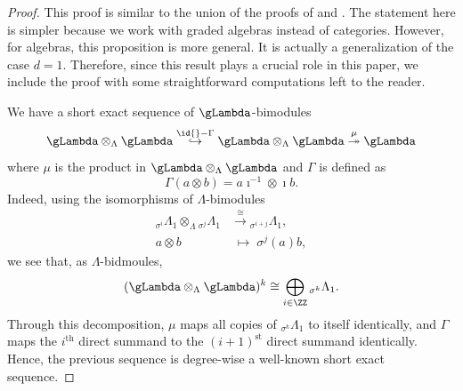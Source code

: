 \documentclass[a4paper]{amsart}
\begin{document}
\begin{proof}
  This proof is similar to the union of the proofs of \cite[Prop.~2.3]{Mur20a} and \cite[Prop.~4.3]{Mur22}. The statement here is simpler because we work with graded algebras instead of categories. However, for algebras, this proposition is more general. It is actually a generalization of the case \(d=1\). Therefore, since this result plays a crucial role in this paper, we include the proof with some straightforward computations left to the reader.

  We have a short exact sequence of \(\gLambda\)-bimodules
  \[\gLambda\otimes_{\Lambda}\gLambda\stackrel{\id{}-\Gamma}{\hookrightarrow}\gLambda\otimes_{\Lambda}\gLambda\stackrel{\mu}{\twoheadrightarrow}\gLambda\]
  where \(\mu\) is the product in \(\gLambda\otimes_{\Lambda}\gLambda\) and \(\Gamma\) is defined as
  \[\Gamma(a\otimes b)=a\imath^{-1}\otimes\imath b.\]
  Indeed, using the isomorphisms of \(\Lambda\)-bimodules
  \begin{align*}
      {}_{\sigma^i}\Lambda_1\otimes_{\Lambda}{}_{\sigma^j}\Lambda_1 & \stackrel{\cong}{\longrightarrow} {}_{\sigma^{i+j}}\Lambda_1, \\
      a\otimes b                                                    & \;\longmapsto\;\sigma^j(a)b,
  \end{align*}
  we see that, as \(\Lambda\)-bidmoules,
  \[(\gLambda\otimes_{\Lambda}\gLambda)^k\cong\bigoplus_{i\in\ZZ}{}_{\sigma^k}\Lambda_1.\]
  Through this decomposition, \(\mu\) maps all copies of \({}_{\sigma^k}\Lambda_1\) to itself identically, and
  \(\Gamma\) maps the \(i^{\text{th}}\) direct summand to the \((i+1)^{\text{st}}\) direct summand identically. Hence, the previous sequence is degree-wise a well-known short exact sequence.


\end{proof}
\end{document}
